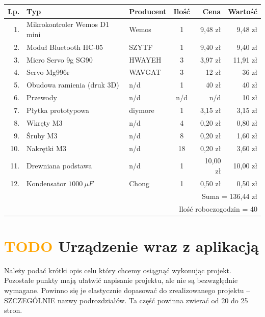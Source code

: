 \documentclass[11pt,titlepage,a4paper]{article}
\begin{document}
\begin{center}
    \begin{tabular}{|r|l|l|c|r|r|}
        \hline
        Lp. & Typ                          & Producent & Ilość & Cena     & Wartość  \\
        \hline
        1.  & Mikrokontroler Wemos D1 mini & Wemos     & 1     & 9,48 zł  & 9,48 zł  \\
        2.  & Moduł Bluetooth HC-05        & SZYTF     & 1     & 9,40 zł  & 9,40 zł  \\
        3.  & Micro Servo 9g SG90          & HWAYEH    & 3     & 3,97 zł  & 11,91 zł \\
        4.  & Servo Mg996r                 & WAVGAT    & 3     & 12 zł    & 36 zł    \\
        5.  & Obudowa ramienia (druk 3D)   & n/d       & 1     & 40 zł    & 40 zł    \\
        6.  & Przewody                     & n/d       & n/d   & n/d      & 10 zł    \\
        7.  & Płytka prototypowa           & diymore   & 1     & 3,15 zł  & 3,15 zł  \\
        8.  & Wkręty M3                    & n/d       & 4     & 0,20 zł  & 0,80 zł  \\
        9.  & Śruby M3                     & n/d       & 8     & 0,20 zł  & 1,60 zł  \\
        10. & Nakrętki M3                  & n/d       & 18    & 0,20 zł  & 3,60 zł  \\
        11. & Drewniana podstawa           & n/d       & 1     & 10,00 zł & 10,00 zł \\
        12. & Kondensator $1000\ \mu F$    & Chong     & 1     & 0,50 zł  & 0,50 zł  \\
        \hline
        \multicolumn{6}{|r|}{Suma = 136,44 zł}                                       \\
        \hline
        \multicolumn{6}{|r|}{Ilość roboczogodzin = 40}                               \\
        \hline
    \end{tabular}
\end{center}

\newpage

\section{\textcolor{orange}{TODO} Urządzenie wraz z aplikacją}

Należy podać krótki opis celu który chcemy osiągnąć wykonując projekt.
Pozostałe punkty mają ułatwić napisanie projektu, ale nie są bezwzględnie wymagane. Powinno się je elastycznie dopasować do zrealizowanego projektu – SZCZEGÓLNIE nazwy podrozdziałów.
Ta część powinna zwierać od 20 do 25 stron.
\end{document}
